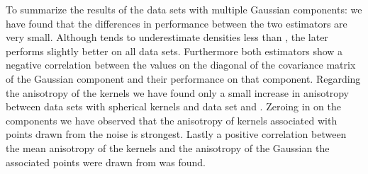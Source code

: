 	To summarize the results of the data sets with multiple Gaussian components: we have found that the differences in performance between the two estimators are very small. Although \sambe tends to underestimate densities less than \mbe, the later performs slightly better on all data sets.
	Furthermore both estimators show a negative correlation between the values on the diagonal of the covariance matrix of the Gaussian component and their performance on that component.
	Regarding the anisotropy of the kernels we have found only a small increase in anisotropy between data sets with spherical kernels and data set \baakmanTwo and \baakmanThree. 
	Zeroing in on the components we have observed that the anisotropy of kernels associated with points drawn from the noise is strongest.
	Lastly a positive correlation between the mean anisotropy of the kernels and the anisotropy of the Gaussian the associated points were drawn from was found. 